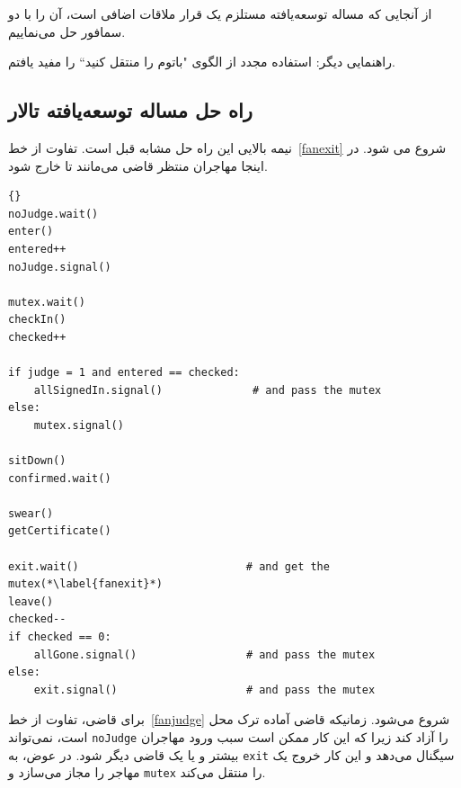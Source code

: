 \documentclass{book}
\newcommand{\clearemptydoublepage}{\newpage\cleardoublepage}
\begin{document}
    از آنجایی که مساله توسعه‌یافته مستلزم یک قرار ملاقات اضافی است،‌ آن را با دو سمافور حل می‌نماییم. 

    راهنمایی دیگر: استفاده مجدد از الگوی "باتوم را منتقل کنید`` را مفید یافتم.


\clearemptydoublepage
\subsection{راه حل مساله توسعه‌یافته تالار }

    نیمه بالایی این راه حل مشابه قبل است. تفاوت از خط~\ref{fanexit} شروع می شود. در اینجا مهاجران منتظر قاضی می‌مانند تا خارج شود. 

\begin{latin}
\begin{lstlisting}[title=\rl{راهنمایی مساله تالار \lr{Faneuil} (مهاجر)}]{}
noJudge.wait()
enter()
entered++
noJudge.signal()

mutex.wait()
checkIn()
checked++

if judge = 1 and entered == checked:
    allSignedIn.signal()              # and pass the mutex
else:
    mutex.signal()

sitDown()
confirmed.wait()

swear()
getCertificate()

exit.wait()                          # and get the mutex(*\label{fanexit}*)
leave()
checked--
if checked == 0:
    allGone.signal()                 # and pass the mutex
else:
    exit.signal()                    # and pass the mutex
\end{lstlisting}
\end{latin}

    برای قاضی، تفاوت از خط~\ref{fanjudge} شروع می‌شود. زمانیکه قاضی آماده ترک محل است، نمی‌تواند  {\tt noJudge} را آزاد کند زیرا که 
    این کار ممکن است سبب ورود مهاجران بیشتر و یا یک قاضی دیگر شود.  در عوض،  به {\tt exit} سیگنال می‌دهد و این کار خروج یک مهاجر را 
    مجاز می‌سازد و  {\tt mutex} را منتقل می‌کند. 
    
\end{document}
